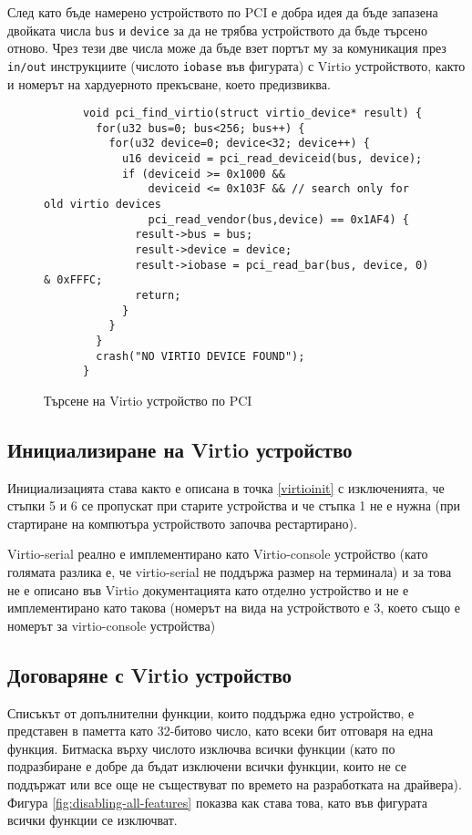   След като бъде намерено устройството по PCI е добра идея да бъде запазена двойката числа {\tt bus} и {\tt device} за да не трябва устройството да бъде търсено отново. Чрез тези две числа може да бъде взет портът му за комуникация през {\tt in/out} инструкциите (числото {\tt iobase} във фигурата) с Virtio устройството, както и номерът на хардуерното прекъсване, което предизвиква.

  \begin{figure}[htpb]
    \centering
    \begin{verbatim}
      void pci_find_virtio(struct virtio_device* result) {
        for(u32 bus=0; bus<256; bus++) {
          for(u32 device=0; device<32; device++) {
            u16 deviceid = pci_read_deviceid(bus, device);
            if (deviceid >= 0x1000 &&
                deviceid <= 0x103F && // search only for old virtio devices
                pci_read_vendor(bus,device) == 0x1AF4) {
              result->bus = bus;
              result->device = device;
              result->iobase = pci_read_bar(bus, device, 0) & 0xFFFC;
              return;
            }
          }
        }
        crash("NO VIRTIO DEVICE FOUND");
      }
    \end{verbatim}
    \caption{Търсене на Virtio устройство по PCI}
    \label{fig:finding-virtio}
  \end{figure}

  \subsection{Инициализиране на Virtio устройство}
  Инициализацията става както е описана в точка \ref{virtioinit} с изключенията, че стъпки 5 и 6 се пропускат при старите устройства и че стъпка 1 не е нужна (при стартиране на компютъра устройството започва рестартирано).

  Virtio-serial реално е имплементирано като Virtio-console устройство (като голямата разлика е, че virtio-serial не поддържа размер на терминала) и за това не е описано във Virtio документацията като отделно устройство и не е имплементирано като такова (номерът на вида на устройството е $3$, което също е номерът за virtio-console устройства)

  \subsection{Договаряне с Virtio устройство}
  Списъкът от допълнителни функции, които поддържа едно устройство, е представен в паметта като 32-битово число, като всеки бит отговаря на една функция. Битмаска върху числото изключва всички функции (като по подразбиране е добре да бъдат изключени всички функции, които не се поддържат или все още не съществуват по времето на разработката на драйвера). Фигура \ref{fig:disabling-all-features} показва как става това, като във фигурата всички функции се изключват.

